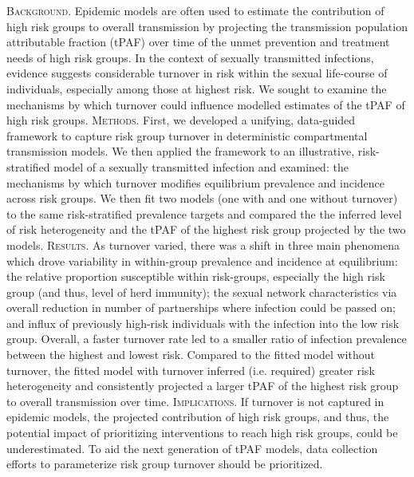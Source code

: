 \textsc{Background.}
Epidemic models are often used to estimate
the contribution of high risk groups to overall transmission 
by projecting the transmission population attributable fraction (tPAF) over time 
of the unmet prevention and treatment needs of high risk groups. 
In the context of sexually transmitted infections, evidence suggests considerable
turnover in risk within the sexual life-course of individuals, especially among those at 
highest risk. We sought to examine the mechanisms by which turnover could 
influence modelled estimates of the tPAF of high risk groups.
\textsc{Methods.}
First, we developed a unifying, data-guided framework to capture risk group turnover 
in deterministic compartmental transmission models.
We then applied the framework to an illustrative, risk-stratified model of 
a sexually transmitted infection and examined: the mechanisms by which 
turnover modifies equilibrium prevalence and incidence across risk groups. %
We then fit two models (one with and one without turnover) to the same 
risk-stratified prevalence targets
and compared the the inferred level of risk heterogeneity and %
the tPAF of the highest risk group projected by the two models.
\textsc{Results.}
As turnover varied, there was a shift in three main phenomena which drove variability in
within-group prevalence and incidence at equilibrium:
the relative proportion susceptible within risk-groups, especially the high risk group (and thus, level of herd immunity); 
the sexual network characteristics via overall reduction in number of partnerships where infection could be passed on; 
and influx of previously high-risk individuals with the infection into the low risk group.
Overall, a faster turnover rate led to a smaller ratio 
of infection prevalence between the highest and lowest risk.
Compared to the fitted model without turnover, the fitted model
with turnover inferred (i.e. required) greater risk heterogeneity
and consistently projected a larger tPAF of the highest risk group 
to overall transmission over time.
\textsc{Implications.}
If turnover is not captured in epidemic models, 
the projected contribution of high risk groups, and thus, 
the potential impact of prioritizing interventions to reach
high risk groups, could be underestimated. To aid the next generation of tPAF models, 
data collection efforts to parameterize risk group turnover should be prioritized. %
\\
